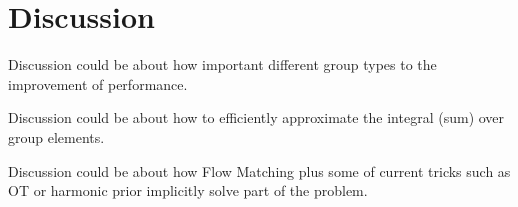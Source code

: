 \section{Discussion}
\label{sec:discussion}

Discussion could be about how important different group types to the improvement of performance. 

Discussion could be about how to efficiently approximate the integral (sum) over group elements. 

Discussion could be about how Flow Matching plus some of current tricks such as OT or harmonic prior implicitly solve part of the problem.